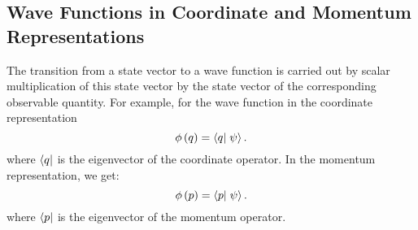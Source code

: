 \subsection{Wave Functions in Coordinate and Momentum Representations}
The transition from a state vector to a wave function is carried out
by scalar multiplication of this state vector by the state
vector of the corresponding observable quantity. For example, for the wave
function in the coordinate representation 
\begin{equation}
\phi\left(q\right) = \bra{q}\left.\psi\right>.
\end{equation}  
where $\bra{q}$ is the eigenvector of the coordinate operator. 
In the momentum representation, we get:
\begin{equation}
\phi\left(p\right) = \bra{p}\left.\psi\right>.
\end{equation}  
where $\bra{p}$ is the eigenvector of the momentum operator.
